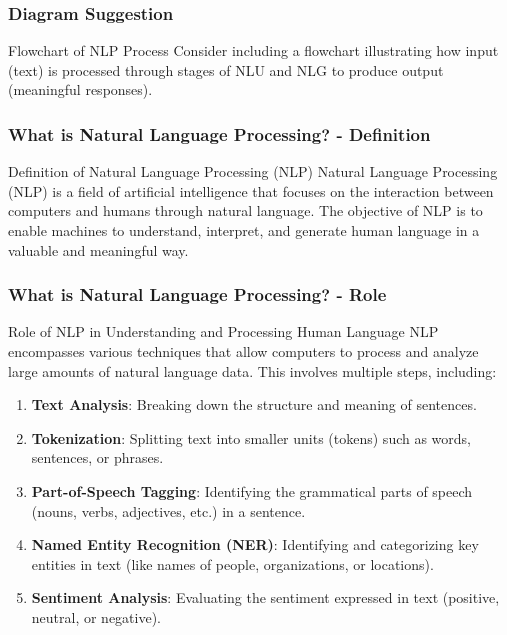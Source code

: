 \documentclass{beamer}
\begin{document}
\begin{frame}[fragile]
    \frametitle{Diagram Suggestion}
    \begin{block}{Flowchart of NLP Process}
        Consider including a flowchart illustrating how input (text) is processed through stages of NLU and NLG to produce output (meaningful responses).
    \end{block}
\end{frame}

\begin{frame}[fragile]
    \frametitle{What is Natural Language Processing? - Definition}
    \begin{block}{Definition of Natural Language Processing (NLP)}
        Natural Language Processing (NLP) is a field of artificial intelligence that focuses on the interaction between computers and humans through natural language. The objective of NLP is to enable machines to understand, interpret, and generate human language in a valuable and meaningful way.
    \end{block}
\end{frame}

\begin{frame}[fragile]
    \frametitle{What is Natural Language Processing? - Role}
    \begin{block}{Role of NLP in Understanding and Processing Human Language}
        NLP encompasses various techniques that allow computers to process and analyze large amounts of natural language data. This involves multiple steps, including:
        \begin{enumerate}
            \item \textbf{Text Analysis}: Breaking down the structure and meaning of sentences.
            \item \textbf{Tokenization}: Splitting text into smaller units (tokens) such as words, sentences, or phrases.
            \item \textbf{Part-of-Speech Tagging}: Identifying the grammatical parts of speech (nouns, verbs, adjectives, etc.) in a sentence.
            \item \textbf{Named Entity Recognition (NER)}: Identifying and categorizing key entities in text (like names of people, organizations, or locations).
            \item \textbf{Sentiment Analysis}: Evaluating the sentiment expressed in text (positive, neutral, or negative).
        \end{enumerate}
    \end{block}
\end{frame}
\end{document}
